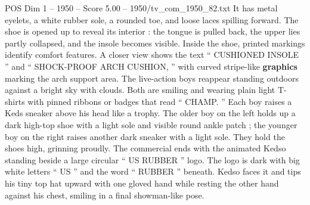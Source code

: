 \begin{textsample}{POS Dim 1 – 1950 – Score 5.00 – 1950/tv\_com\_1950\_82.txt}
It has metal eyelets, a white rubber sole, a rounded toe, and loose laces spilling forward.
The shoe is opened up to reveal its interior : the tongue is pulled back, the upper lies partly collapsed, and the insole becomes visible.
Inside the shoe, printed markings identify comfort features.
A closer view shows the text “ CUSHIONED INSOLE ” and “ SHOCK-PROOF ARCH CUSHION, ” with curved stripe-like \textbf{graphics} marking the arch support area.
The live-action boys reappear standing outdoors against a bright sky with clouds.
Both are smiling and wearing plain light T-shirts with pinned ribbons or badges that read “ CHAMP. ” Each boy raises a Keds sneaker above his head like a trophy.
The older boy on the left holds up a dark high-top shoe with a light sole and visible round ankle patch ; the younger boy on the right raises another dark sneaker with a light sole.
They hold the shoes high, grinning proudly.
The commercial ends with the animated Kedso standing beside a large circular “ US RUBBER ” logo.
The logo is dark with big white letters “ US ” and the word “ RUBBER ” beneath.
Kedso faces it and tips his tiny top hat upward with one gloved hand while resting the other hand against his chest, smiling in a final showman-like pose.

\end{textsample}
